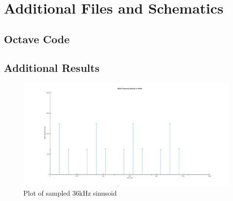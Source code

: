 \chapter{Additional Files and Schematics}
\label{ch_appendixa}

\section{Octave Code}





\section{Additional Results}

\begin{figure}[H]
	\centering
	\includegraphics[width=\linewidth]{figures/results/36khz_frequency.png}
	\caption{Plot of sampled 36kHz sinusoid}
	\label{fig:sampled_36khz_sinusoid}
\end{figure}


